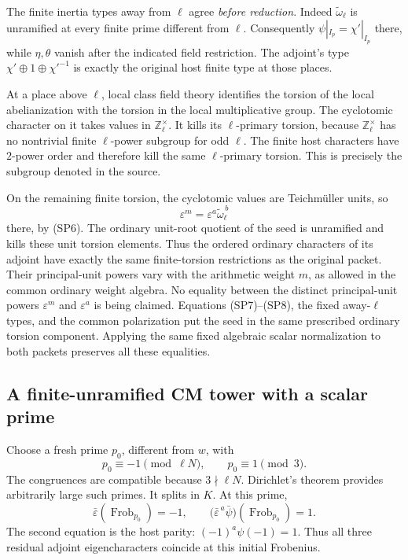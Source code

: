 The finite inertia types away from \(\ell\) agree
\emph{before reduction}.
Indeed \(\widetilde\omega_\ell\) is unramified at every
finite prime different from \(\ell\).
Consequently \(\psi|_{I_p}=\chi'|_{I_p}\) there, while
\(\eta,\theta\) vanish after the indicated field restriction.
The adjoint's type
\(\chi'\oplus1\oplus\chi'^{-1}\) is exactly the original
host finite type at those places.

At a place above \(\ell\), local class field theory identifies
the torsion of the local abelianization with the torsion
in the local multiplicative group.
The cyclotomic character on it takes values in
\(\mathbb Z_\ell^\times\).
It kills its \(\ell\)-primary torsion, because
\(\mathbb Z_\ell^\times\) has no nontrivial finite
\(\ell\)-power subgroup for odd \(\ell\).
The finite host characters have \(2\)-power order and
therefore kill the same \(\ell\)-primary torsion.
This is precisely the subgroup denoted
 in the source.

On the remaining finite torsion, the cyclotomic values are
Teichm\"uller units, so
\[
           \varepsilon^m
              =\varepsilon^a\widetilde\omega_\ell^{\,b}
 \tag{SP8}
\]
there, by (SP6).
The ordinary unit-root quotient of the seed is unramified
and kills these unit torsion elements.
Thus the ordered ordinary characters of its adjoint have
exactly the same finite-torsion restrictions as the original
packet.
Their principal-unit powers vary with the arithmetic
weight \(m\), as allowed in the common ordinary weight
algebra.
No equality between the distinct principal-unit powers
\(\varepsilon^m\) and \(\varepsilon^a\) is being claimed.
Equations (SP7)--(SP8), the fixed away-\(\ell\) types, and
the common polarization put the seed in the same prescribed
ordinary torsion component.
Applying the same fixed algebraic scalar normalization to
both packets preserves all these equalities.

\subsection{A finite-unramified CM tower with a scalar prime}
Choose a fresh prime \(p_0\), different from \(w\), with
\[
                 p_0\equiv-1\pmod{\ell N},\qquad
                              p_0\equiv1\pmod3 .
 \tag{SP9}
\]
The congruences are compatible because \(3\nmid\ell N\).
Dirichlet's theorem provides arbitrarily large such primes.
It splits in \(K\).
At this prime,
\[
 \bar\varepsilon(\operatorname{Frob}_{p_0})=-1,\qquad
 \bigl(\bar\varepsilon^{\,a}\bar\psi\bigr)
                      (\operatorname{Frob}_{p_0})=1.
 \tag{SP10}
\]
The second equation is the host parity:
\((-1)^a\psi(-1)=1\).
Thus all three residual adjoint eigencharacters coincide
at this initial Frobenius.

